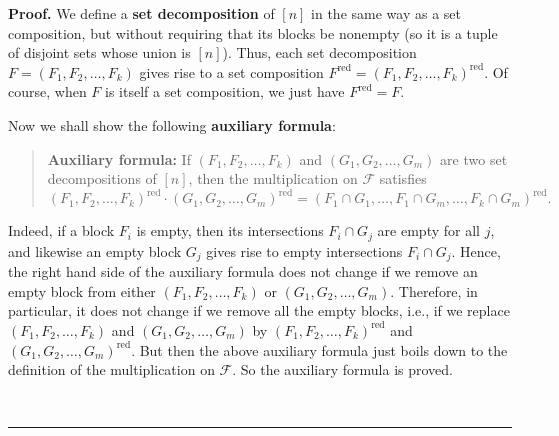 \documentclass[12pt]{article}
\theoremstyle{definition}%
\theoremstyle{definition}%
\theoremstyle{remark}%
\newcommand{\tup}[1]{\left( #1 \right)}
\newcommand{\interval}[1]{\left[ #1 \right]} %
\newcommand{\CF}{\mathcal{F}}
\newcommand{\red}{\operatorname{red}}
\newcommand{\defin}[1]{\textbf{#1}}
\newenvironment{proof}[1][Proof]{\noindent\textbf{#1.} }{\ \rule{0.5em}{0.5em}}
\begin{document}
\begin{proof}
We define a \defin{set decomposition} of $\interval{n}$ in the same way as a set composition, but without requiring that its blocks be nonempty (so it is a tuple of disjoint sets
whose union is $\interval{n}$).
Thus, each set decomposition $F = \tup{F_{1},F_{2},\dots,F_k}$ gives rise to a set composition $F^{\red} = \tup{F_{1},F_{2},\dots,F_k}^{\red}$. Of course, when $F$ is itself a set composition, we just have $F^{\red} = F$.

Now we shall show the following \defin{auxiliary formula}:
\begin{quote}
\textbf{Auxiliary formula:}
If $\tup{F_{1},F_{2},\dots,F_k}$ and $\tup{G_{1},G_{2},\dots,G_{m}}$ are two set decompositions of $\interval{n}$, then the multiplication on $\CF$ satisfies
        \[
        \tup{F_{1},F_{2},\dots,F_{k}}^{\red} \cdot \tup{G_{1},G_{2},\dots,G_{m}}^{\red} = \tup{F_{1} \cap G_{1}, \dots,F_{1} \cap G_{m},\dots, F_{k} \cap G_{m}}^{\red}.
        \]
\end{quote}
Indeed, if a block $F_i$ is empty, then its intersections $F_i \cap G_j$ are empty for all $j$, and likewise an empty block $G_j$ gives rise to empty intersections $F_i \cap G_j$.
Hence, the right hand side of the auxiliary formula does not change if we remove an empty block from either $\tup{F_{1},F_{2},\dots,F_{k}}$ or $\tup{G_{1},G_{2},\dots,G_{m}}$.
Therefore, in particular, it does not change if we remove all the empty blocks, i.e., if we replace $\tup{F_{1},F_{2},\dots,F_{k}}$ and $\tup{G_{1},G_{2},\dots,G_{m}}$ by $\tup{F_{1},F_{2},\dots,F_{k}}^{\red}$ and $\tup{G_{1},G_{2},\dots,G_{m}}^{\red}$.
But then the above auxiliary formula just boils down to the definition of the multiplication on $\CF$.
So the auxiliary formula is proved.


\end{proof}
\end{document}
